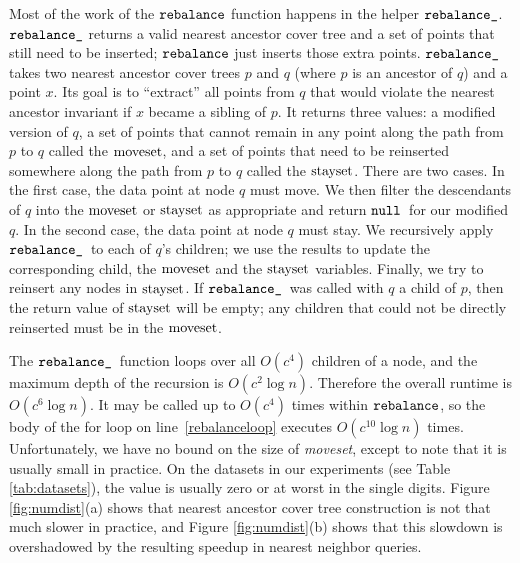 \documentclass[../main.tex]{subfiles}
\newcommand{\rebalance}{\ensuremath{\textnormal{\ttfamily rebalance}}}
\newcommand{\rebalanceHelper}{\ensuremath{\textnormal{\ttfamily rebalance\_}}}
\newcommand{\mkvar}[1]{\ensuremath{\textnormal{\emph{{#1}}}}}
\newcommand{\nullvar}{\ensuremath{\textup{\textnormal{\ttfamily null}}}}
\begin{document}
Most of the work of the $\rebalance$ function happens in the helper $\rebalanceHelper$.
$\rebalanceHelper$ returns a valid nearest ancestor cover tree and a set of points that still need to be inserted;
$\rebalance$ just inserts those extra points.
$\rebalanceHelper$ takes two nearest ancestor cover trees $p$ and $q$ (where $p$ is an ancestor of $q$) and a point $x$.
Its goal is to ``extract'' all points from $q$ that would violate the nearest ancestor invariant if $x$ became a sibling of $p$.
It returns three values:
a modified version of $q$,
a set of points that cannot remain in any point along the path from $p$ to $q$ called the \mkvar{moveset},
and a set of points that need to be reinserted somewhere along the path from $p$ to $q$ called the \mkvar{stayset}.
There are two cases.
In the first case, the data point at node $q$ must move.
We then filter the descendants of $q$ into the \mkvar{moveset} or \mkvar{stayset} as appropriate and return \nullvar\ for our modified $q$.
In the second case, the data point at node $q$ must stay.
We recursively apply \rebalanceHelper~to each of $q$'s children;
we use the results to update the corresponding child, the \mkvar{moveset} and the \mkvar{stayset} variables.
Finally, we try to reinsert any nodes in \mkvar{stayset}.
If \rebalanceHelper~was called with $q$ a child of $p$, then the return value of \mkvar{stayset} will be empty;
any children that could not be directly reinserted must be in the \mkvar{moveset}.

The \rebalanceHelper~function loops over all $O(c^4)$ children of a node, and the maximum depth of the recursion is $O(c^2 \log n)$.
Therefore the overall runtime is $O(c^6 \log n)$.
It may be called up to $O(c^4)$ times within \rebalance, so the body of the for loop on line~\ref{rebalanceloop} executes $O(c^{10}\log n)$ times.
Unfortunately, we have no bound on the size of \emph{moveset}, except to note that it is usually small in practice.
On the datasets in our experiments (see Table \ref{tab:datasets}), the value is usually zero or at worst in the single digits.
Figure \ref{fig:numdist}(a) shows that nearest ancestor cover tree construction is not that much slower in practice,
and Figure \ref{fig:numdist}(b) shows that this slowdown is overshadowed by the resulting speedup in nearest neighbor queries.
\end{document}
